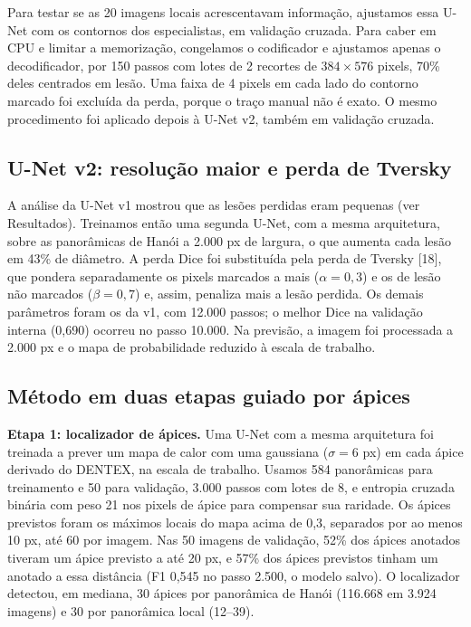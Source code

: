 \documentclass[twocolumn]{article}
\begin{document}
Para testar se as 20 imagens locais acrescentavam informação, ajustamos essa U-Net com os contornos dos especialistas, em validação cruzada. Para caber em CPU e limitar a memorização, congelamos o codificador e ajustamos apenas o decodificador, por 150 passos com lotes de 2 recortes de $384 \times 576$ pixels, 70\% deles centrados em lesão. Uma faixa de 4 pixels em cada lado do contorno marcado foi excluída da perda, porque o traço manual não é exato. O mesmo procedimento foi aplicado depois à U-Net v2, também em validação cruzada.

\subsection{U-Net v2: resolução maior e perda de Tversky}

A análise da U-Net v1 mostrou que as lesões perdidas eram pequenas (ver Resultados). Treinamos então uma segunda U-Net, com a mesma arquitetura, sobre as panorâmicas de Hanói a 2.000 px de largura, o que aumenta cada lesão em 43\% de diâmetro. A perda Dice foi substituída pela perda de Tversky [18], que pondera separadamente os pixels marcados a mais ($\alpha = 0{,}3$) e os de lesão não marcados ($\beta = 0{,}7$) e, assim, penaliza mais a lesão perdida. Os demais parâmetros foram os da v1, com 12.000 passos; o melhor Dice na validação interna (0,690) ocorreu no passo 10.000. Na previsão, a imagem foi processada a 2.000 px e o mapa de probabilidade reduzido à escala de trabalho.

\subsection{Método em duas etapas guiado por ápices}

\textbf{Etapa 1: localizador de ápices.} Uma U-Net com a mesma arquitetura foi treinada a prever um mapa de calor com uma gaussiana ($\sigma = 6$ px) em cada ápice derivado do DENTEX, na escala de trabalho. Usamos 584 panorâmicas para treinamento e 50 para validação, 3.000 passos com lotes de 8, e entropia cruzada binária com peso 21 nos pixels de ápice para compensar sua raridade. Os ápices previstos foram os máximos locais do mapa acima de 0,3, separados por ao menos 10 px, até 60 por imagem. Nas 50 imagens de validação, 52\% dos ápices anotados tiveram um ápice previsto a até 20 px, e 57\% dos ápices previstos tinham um anotado a essa distância (F1 0,545 no passo 2.500, o modelo salvo). O localizador detectou, em mediana, 30 ápices por panorâmica de Hanói (116.668 em 3.924 imagens) e 30 por panorâmica local (12--39).
\end{document}
